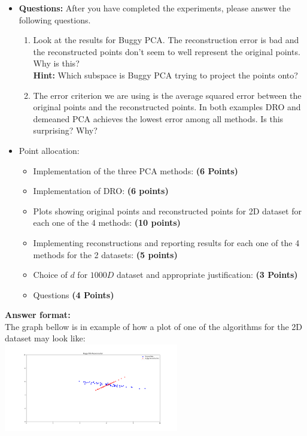 \documentclass[a4paper]{article}
\newcounter{thm}
\theoremstyle{definition}
\begin{document}
\begin{itemize}
\item \textbf{Questions:} After you have completed the experiments, please answer the following questions.
\begin{enumerate}
\item Look at the results for Buggy PCA. The reconstruction error is bad and the
reconstructed points don't seem to well represent the original points. Why is
this? \\
\textbf{Hint: } Which subspace is Buggy PCA trying to project the points
onto?
\item The error criterion we are using is the average squared error
between the original points and the reconstructed points.
In both examples DRO and demeaned PCA achieves the lowest error among all
methods.
Is this surprising? Why?
\end{enumerate}

\item Point allocation:
\begin{itemize}
\item Implementation of the three PCA methods: \textbf{(6 Points)}
\item Implementation of DRO: \textbf{(6 points)}
\item Plots showing original points and reconstructed points for 2D dataset for each one of the 4 methods: \textbf{(10 points)}
\item Implementing reconstructions and reporting results for each one of the 4 methods for the 2 datasets: \textbf{(5 points)}
\item Choice of $d$ for $1000D$ dataset and appropriate justification:
\textbf{(3 Points)}
\item Questions \textbf{(4 Points)}
\end{itemize}

\end{itemize}



\vspace{0.2in}

\textbf{Answer format:}  \\
The graph bellow is in example of how a plot of one of the algorithms for the 2D dataset may look like: \\
\includegraphics[width=3in]{buggy_pca} \hspace{0.4in}
\\
\end{document}
